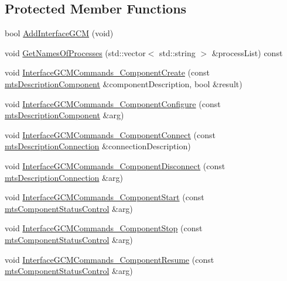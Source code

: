 \subsection*{Protected Member Functions}
\begin{DoxyCompactItemize}
\item 
bool \hyperlink{classmts_manager_component_server_a3384159cec50ef6169f8c8b38dcee9bd}{Add\+Interface\+G\+C\+M} (void)
\item 
void \hyperlink{classmts_manager_component_server_a12a96063cacc87c1d9d808fefbae6ac0}{Get\+Names\+Of\+Processes} (std\+::vector$<$ std\+::string $>$ \&process\+List) const 
\item 
void \hyperlink{classmts_manager_component_server_aaed93e634c3edb8108f6211bd409a05b}{Interface\+G\+C\+M\+Commands\+\_\+\+Component\+Create} (const \hyperlink{classmts_description_component}{mts\+Description\+Component} \&component\+Description, bool \&result)
\item 
void \hyperlink{classmts_manager_component_server_ac1a005492dde62b258eadcdc5ec20232}{Interface\+G\+C\+M\+Commands\+\_\+\+Component\+Configure} (const \hyperlink{classmts_description_component}{mts\+Description\+Component} \&arg)
\item 
void \hyperlink{classmts_manager_component_server_ae635792d3cd3fb4d84167e4ee149c664}{Interface\+G\+C\+M\+Commands\+\_\+\+Component\+Connect} (const \hyperlink{classmts_description_connection}{mts\+Description\+Connection} \&connection\+Description)
\item 
void \hyperlink{classmts_manager_component_server_a734eefb7e18ba05156a9ca1443a77b39}{Interface\+G\+C\+M\+Commands\+\_\+\+Component\+Disconnect} (const \hyperlink{classmts_description_connection}{mts\+Description\+Connection} \&arg)
\item 
void \hyperlink{classmts_manager_component_server_afe4917628e2e91dfe20fffafc43fe746}{Interface\+G\+C\+M\+Commands\+\_\+\+Component\+Start} (const \hyperlink{classmts_component_status_control}{mts\+Component\+Status\+Control} \&arg)
\item 
void \hyperlink{classmts_manager_component_server_af2f4fc96e195cc1a7d5811a3fdb8e379}{Interface\+G\+C\+M\+Commands\+\_\+\+Component\+Stop} (const \hyperlink{classmts_component_status_control}{mts\+Component\+Status\+Control} \&arg)
\item 
void \hyperlink{classmts_manager_component_server_a9029510ae1992a36feb9388dbceb098b}{Interface\+G\+C\+M\+Commands\+\_\+\+Component\+Resume} (const \hyperlink{classmts_component_status_control}{mts\+Component\+Status\+Control} \&arg)

\end{DoxyCompactItemize}
